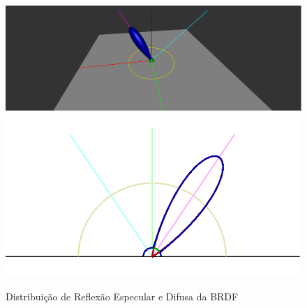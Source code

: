 \begin{figure}[H]
    \caption{\small{Distribuição de Reflexão Especular e Difusa da BRDF}}\label{fig-blinn-phong-plots}
    \vspace{42px}
  \includegraphics[width=\linewidth]{./Imagens/brdfs/blinn-phong-3D-plot}
\endminipage\hfill
{}
  \includegraphics[width=\linewidth]{./Imagens/brdfs/blinn-phong-polar-plot-log.png}
\endminipage\hfill
\end{figure}

